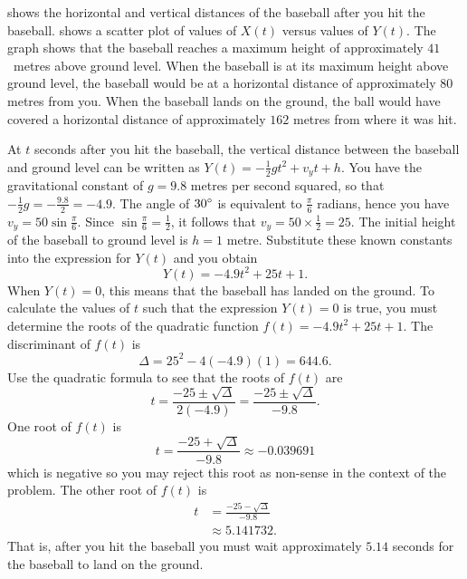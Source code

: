 \documentclass[a4paper,oneside,12pt]{article}
\begin{document}
\begin{problem}
{\begin{solution}
 shows the horizontal and
vertical distances of the baseball after you hit the baseball.
 shows a scatter plot of
values of $X(t)$ versus values of $Y(t)$.  The graph shows that the
baseball reaches a maximum height of approximately $41$~metres above
ground level.  When the baseball is at its maximum height above ground
level, the baseball would be at a horizontal distance of approximately
$80$ metres from you.  When the baseball lands on the ground, the ball
would have covered a horizontal distance of approximately $162$ metres
from where it was hit.

At $t$ seconds after you hit the baseball, the vertical distance
between the baseball and ground level can be written as
$Y(t) = -\frac{1}{2}g t^2 + v_y t + h$.  You have the gravitational
constant of $g = 9.8$ metres per second squared, so that
$-\frac{1}{2}g = -\frac{9.8}{2} = -4.9$.  The angle of ${30}^{\circ}$
is equivalent to $\frac{\pi}{6}$ radians, hence you have
$v_y = 50 \sin\frac{\pi}{6}$.  Since
$\sin\frac{\pi}{6} = \frac{1}{2}$, it follows that
$v_y = 50 \times \frac{1}{2} = 25$.  The initial height of the
baseball to ground level is $h = 1$ metre.  Substitute these known
constants into the expression for $Y(t)$ and you obtain
\[
Y(t)
=
-4.9t^2 + 25t + 1.
\]
When $Y(t) = 0$, this means that the baseball has landed on the
ground.  To calculate the values of $t$ such that the expression
$Y(t) = 0$ is true, you must determine the roots of the quadratic
function $f(t) = -4.9t^2 + 25t + 1$.  The discriminant of $f(t)$ is
\[
\Delta
=
25^2 - 4(-4.9)(1)
=
644.6.
\]
Use the quadratic formula to see that the roots of $f(t)$ are
\[
t
=
\frac{
  -25 \pm \sqrt{\Delta}
}{
  2(-4.9)
}
=
\frac{
  -25 \pm \sqrt{\Delta}
}{
  -9.8
}.
\]
One root of $f(t)$ is
\[
t
=
\frac{
  -25 + \sqrt{\Delta}
}{
  -9.8
}
\approx
-0.039691
\]
which is negative so you may reject this root as non-sense in the
context of the problem.  The other root of $f(t)$ is
\begin{equation}
\label{eqn:trigonometric:baseball_30_degree_root}
\begin{aligned}
t
&=
\frac{
  -25 - \sqrt{\Delta}
}{
  -9.8
} \\[4pt]
&\approx
5.141732.
\end{aligned}
\end{equation}
That is, after you hit the baseball you must wait approximately
$5.14$ seconds for the baseball to land on the ground.


\end{solution}}
\end{problem}
\end{document}
